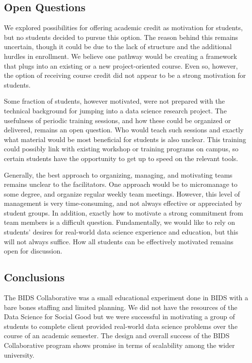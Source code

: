 \documentclass{sig-alternate}
\begin{document}
\subsection{Open Questions}

We explored possibilities for offering academic credit as motivation for students, but no students decided to pursue this option. The reason behind this remains uncertain, though it could be due to the lack of structure and the additional hurdles in enrollment. We believe one pathway would be creating a framework that plugs into an existing or a new project-oriented course.  Even so, however, the option of receiving course credit did not appear to be a strong motivation for students.

Some fraction of students, however motivated, were not prepared with the technical background for jumping into a data science research project.  The usefulness of periodic training sessions, and how these could be organized or delivered, remains an open question.  Who would teach such sessions and exactly what material would be most beneficial for students is also unclear.  This training could possibly link with existing workshop or training programs on campus, so certain students have the opportunity to get up to speed on the relevant tools.

Generally, the best approach to organizing, managing, and motivating teams remains unclear to the facilitators.  One approach would be to micromanage to some degree, and organize regular weekly team meetings.  However, this level of management is very time-consuming, and not always effective or appreciated by student groups.  In addition, exactly how to motivate a strong commitment from team members is a difficult question.  Fundamentally, we would like to rely on students' desires for real-world data science experience and education, but this will not always suffice.  How all students can be effectively motivated remains open for discussion.

\subsection{Conclusions}

The BIDS Collaborative was a small educational experiment done in BIDS with a bare bones staffing and limited planning. We did not have the resources of the Data Science for Social Good but we were successful in motivating a group of students to complete client provided real-world data science problems over the course of an academic semester.  The design and overall success of the BIDS Collaborative program shows promise in terms of scalability among the wider university.
\end{document}
